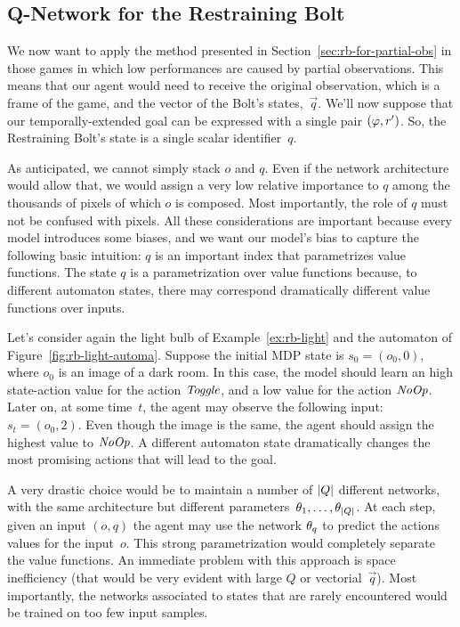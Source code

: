 \subsection{Q-Network for the Restraining Bolt}

\label{sec:model-atari-rb}

We now want to apply the method presented in
Section~\ref{sec:rb-for-partial-obs} in those games in which low performances
are caused by partial observations. This means that our agent would need to
receive the original observation, which is a frame of the game, and the
vector of the Bolt's states,~$\vec{q}$. We'll now suppose that our
temporally-extended goal can be expressed with a single pair ${(\varphi,
r')}$. So, the Restraining Bolt's state is a single scalar identifier~$q$.

As anticipated, we cannot simply stack $o$ and $q$. Even if the network
architecture would allow that, we would assign a very low relative importance
to $q$ among the thousands of pixels of which $o$ is composed. Most
importantly, the role of $q$ must not be confused with pixels. All these
considerations are important because every model introduces some biases, and
we want our model's bias to capture the following basic intuition: $q$ is an
important index that parametrizes value functions. The state $q$ is a
parametrization over value functions because, to different automaton states,
there may correspond dramatically different value functions over inputs.

\begin{example}
	Let's consider again the light bulb of Example~\ref{ex:rb-light} and
	the automaton of Figure~\ref{fig:rb-light-automa}. Suppose the initial MDP
	state is $s_0 = (o_0, 0)$, where $o_0$ is an image of a dark room. In this
	case, the model should learn an high state-action value for the action
	$\text{\textit{Toggle}}$, and a low value for the action $\text{\textit{NoOp}}$. Later on,
	at some time~$t$, the agent may observe the following input: $s_t = (o_0,
	2)$. Even though the image is the same, the agent should assign the highest
	value to $\text{\textit{NoOp}}$. A different automaton state dramatically changes
	the most promising actions that will lead to the goal.
\end{example}

A very drastic choice would be to maintain a number of $\lvert Q\rvert$ different
networks, with the same architecture but different parameters~$\theta_1,
\dots, \theta_{\lvert Q\rvert}$. At each step, given an input $(o, q)$ the agent may
use the network $\theta_q$ to predict the actions values for the input~$o$.
This strong parametrization would completely separate the value functions.
An immediate problem with this approach is space inefficiency (that would be
very evident with large $Q$ or vectorial~$\vec{q}$). Most importantly, the
networks associated to states that are rarely encountered would be trained
on too few input samples.

